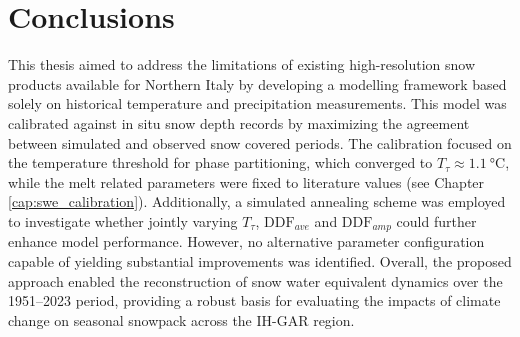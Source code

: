 \chapter{Conclusions}
\label{cap:conclusions}

This thesis aimed to address the limitations of existing high-resolution snow products available for Northern Italy by developing a modelling 
framework based solely on historical temperature and precipitation measurements. This model was calibrated against in situ snow depth records by 
maximizing the agreement between simulated and observed snow covered periods. The calibration focused on the temperature threshold for phase 
partitioning, which converged to $T_\tau \approx \SI{1.1}{\degreeCelsius}$, while the melt related parameters were fixed to literature values 
(see Chapter \ref{cap:swe_calibration}). Additionally, a simulated annealing scheme was employed to investigate whether jointly varying $T_\tau$, 
$\text{DDF}_{ave}$ and $\text{DDF}_{amp}$ could further enhance model performance. However, no alternative parameter configuration capable of 
yielding substantial improvements was identified. Overall, the proposed approach enabled the reconstruction of snow water equivalent dynamics over 
the 1951--2023 period, providing a robust basis for evaluating the impacts of climate change on seasonal snowpack across the IH-GAR region. 

